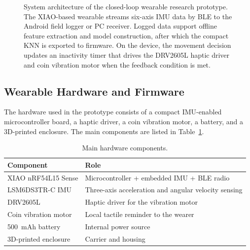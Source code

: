 \begin{figure}[t]
{
    }
    \caption{System architecture of the closed-loop wearable research prototype. The XIAO-based wearable streams six-axis IMU data by BLE to the Android field logger or PC receiver. Logged data support offline feature extraction and model construction, after which the compact KNN is exported to firmware. On the device, the movement decision updates an inactivity timer that drives the DRV2605L haptic driver and coin vibration motor when the feedback condition is met.}
    \label{fig:system_architecture}
\end{figure}

\subsection{Wearable Hardware and Firmware}\label{sec:wearable_hardware_firmware}

The hardware used in the prototype consists of a compact IMU-enabled microcontroller board, a haptic driver, a coin vibration motor, a battery, and a 3D-printed enclosure. The main components are listed in Table~\ref{tab:prototype_components}.

\begin{table}[!htbp]
    \centering
    \footnotesize
    \caption{Main hardware components.}
    \label{tab:prototype_components}
    \begin{tabularx}{\linewidth}{lX}
        \toprule
        Component & Role \\
        \midrule
        XIAO nRF54L15 Sense & Microcontroller + embedded IMU + BLE radio \\
        LSM6DS3TR-C IMU & Three-axis acceleration and angular velocity sensing \\
        DRV2605L & Haptic driver for the vibration motor \\
        Coin vibration motor & Local tactile reminder to the wearer \\
        500~mAh battery & Internal power source \\
        3D-printed enclosure & Carrier and housing \\
        \bottomrule
    \end{tabularx}
\end{table}

